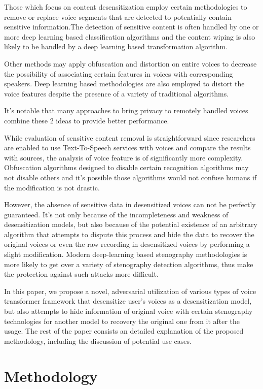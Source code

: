 \documentclass[journal]{IEEEtran} %
\begin{document}
Those which focus on content desensitization employ certain methodologies to remove or replace voice segments that are detected to potentially contain sensitive information.The detection of sensitive content is often handled by one or more deep learning based classification algorithms and the content wiping is also likely to be handled by a deep learning based transformation algorithm.

Other methods may apply obfuscation and distortion on entire voices to decrease the possibility of associating certain features in voices with corresponding speakers. Deep learning based methodologies are also employed to distort the voice features despite the presence of a variety of traditional algorithms. 

It's notable that many approaches to bring privacy to remotely handled voices combine these 2 ideas to provide better performance.

While evaluation of sensitive content removal is straightforward since researchers are enabled to use Text-To-Speech services with voices and compare the results with sources, the analysis of voice feature is of significantly more complexity. Obfuscation algorithms designed to disable certain recognition algorithms may not disable others and it's possible those algorithms would not confuse humans if the modification is not drastic.

However, the absence of sensitive data in desensitized voices can not be perfectly guaranteed. It's not only because of the incompleteness and weakness of desensitization models, but also because of the potential existence of an arbitrary algorithm that attempts to dispute this process and hide the data to recover the original voices or even the raw recording in desensitized voices by performing a slight modification. Modern deep-learning based stenography methodologies is more likely to get over a variety of stenography detection algorithms\cite{a1}, thus make the protection against such attacks more difficult.

In this paper, we propose a novel, adversarial utilization of various types of voice transformer framework that desensitize user's voices as a desensitization model, but also attempts to hide information of original voice with certain stenography technologies for another model to recovery the original one from it after the usage. The rest of the paper consists an detailed explanation of the proposed methodology, including the discussion of potential use cases.

\section{Methodology}
\end{document}
